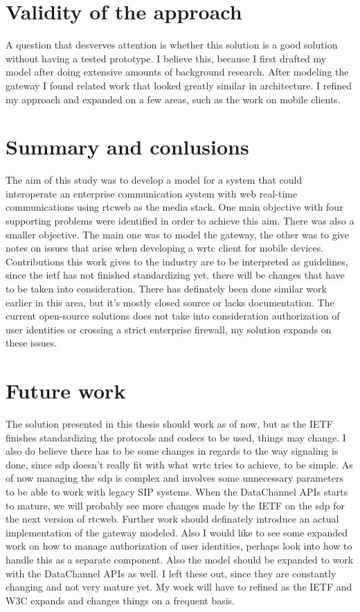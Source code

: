 \section{Validity of the approach}
A question that desverves attention is whether this solution is a good solution without having a tested prototype. I believe this, because I first drafted my model after doing extensive amounts of background research. After modeling the gateway I found related work that looked greatly similar in architecture. I refined my approach and expanded on a few areas, such as the work on mobile clients.

\section{Summary and conlusions}
The aim of this study was to develop a model for a system that could interoperate an enterprise communication system with web real-time communications using \gls{rtcweb} as the media stack. One main objective with four supporting problems were identified in order to achieve this aim. There was also a smaller objective. The main one was to model the gateway, the other was to give notes on issues that arise when developing a \gls{wrtc} client for mobile devices. Contributions this work gives to the industry are to be interpreted as guidelines, since the \gls{ietf} has not finished standardizing yet, there will be changes that have to be taken into consideration. There has definately been done similar work earlier in this area, but it's mostly closed source or lacks documentation. The current open-source solutions does not take into consideration authorization of user identities or crossing a strict enterprise firewall, my solution expands on these issues.

\section{Future work}
The solution presented in this thesis should work as of now, but as the IETF finishes standardizing the protocols and codecs to be used, things may change. I also do believe there has to be some changes in regards to the way signaling is done, since \gls{sdp} doesn't really fit with what \gls{wrtc} tries to achieve, to be simple. As of now managing the \gls{sdp} is complex and involves some unnecessary parameters to be able to work with legacy SIP systems. When the DataChannel APIs starts to mature, we will probably see more changes made by the IETF on the \gls{sdp} for the next version of \gls{rtcweb}. Further work should definately introduce an actual implementation of the gateway modeled. Also I would like to see some expanded work on how to manage authorization of user identities, perhaps look into how to handle this as a separate component. Also the model should be expanded to work with the DataChannel APIs as well. I left these out, since they are constantly changing and not very mature yet. My work will have to refined as the IETF and W3C expands and changes things on a frequent basis.

